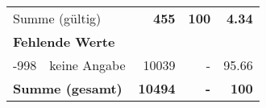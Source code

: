 \begin{longtable}{lXrrr}
     \midrule
     \multicolumn{2}{l}{Summe (gültig)} &
       \textbf{\num{455}} &
     \textbf{100} &
       \textbf{\num[round-mode=places,round-precision=2]{4,34}} \\
     \multicolumn{5}{l}{\textbf{Fehlende Werte}}\\
       -998 &
       keine Angabe &
         \num{10039} &
        - &
         \num[round-mode=places,round-precision=2]{95,66} \\
     \midrule
     \multicolumn{2}{l}{\textbf{Summe (gesamt)}} &
          \textbf{\num{10494}} &
        \textbf{-} &
        \textbf{100} \\
     \bottomrule
     \end{longtable}
     
